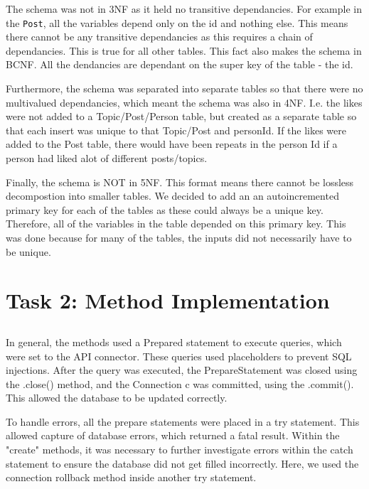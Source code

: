 \documentclass{article}
\begin{document}
The schema was not in 3NF as it held no transitive dependancies. For example in the \texttt{Post}, all the variables depend only on the id and nothing else. This means there cannot be any transitive dependancies as this requires a chain of dependancies. This is true for all other tables. This fact also makes the schema in BCNF. All the dendancies are dependant on the super key of the table - the id.

Furthermore, the schema was separated into separate tables so that there were no multivalued dependancies, which meant the schema was also in 4NF. I.e. the likes were not added to a Topic/Post/Person table, but created as a separate table so that each insert was unique to that Topic/Post and personId. If the likes were added to the Post table, there would have been repeats in the person Id if a person had liked alot of different posts/topics.

Finally, the schema is NOT in 5NF. This format means there cannot be lossless decompostion into smaller tables. We decided to add an an autoincremented primary key for each of the tables as these could always be a unique key. Therefore, all of the variables in the table depended on this primary key. This was done because for many of the tables, the inputs did not necessarily have to be unique. 



\newpage
\section*{Task 2: Method Implementation}

\subsection*{}

In general, the methods used a Prepared statement to execute queries, which were set to the API connector. These queries used placeholders to prevent SQL injections. After the query was executed, the PrepareStatement was closed using the .close() method, and the Connection c was committed, using the .commit(). This allowed the database to be updated correctly.

To handle errors, all the prepare statements were placed in a try statement. This allowed capture of database errors, which returned a fatal result. Within the "create" methods, it was necessary to further investigate errors within the catch statement to ensure the database did not get filled incorrectly. Here, we used the connection rollback method inside another try statement.
\end{document}
